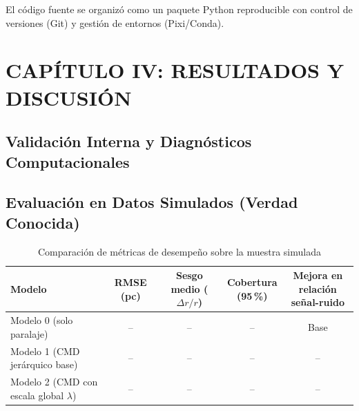 \documentclass[stu, 12pt, letterpaper, donotrepeattitle, floatsintext, natbib]{apa7_ula}
\begin{document}
El código fuente se organizó como un paquete Python reproducible
con control de versiones (Git) y gestión de entornos (Pixi/Conda).


\section{CAPÍTULO IV: RESULTADOS Y DISCUSIÓN}

\subsection{Validación Interna y Diagnósticos Computacionales}

\subsection{Evaluación en Datos Simulados (Verdad Conocida)}

\begin{table}[H]
\centering
\small
\caption{Comparación de métricas de desempeño sobre la muestra simulada}\label{tab:resultados_simulados}
\begin{tabular}{@{}p{4.8cm}cccc@{}}
\hline
Modelo & RMSE (pc) & \shortstack{Sesgo medio\\($\Delta r / r$)} & \shortstack{Cobertura\\(95\,\%)} & \shortstack{Mejora en\\relación señal-ruido} \\
\hline
Modelo 0 (solo paralaje) & -- & -- & -- & Base \\
Modelo 1 (CMD jerárquico base) & -- & -- & -- & -- \\
Modelo 2 (CMD con escala global $\lambda$) & -- & -- & -- & -- \\
\hline
\end{tabular}
\end{table}
\end{document}
